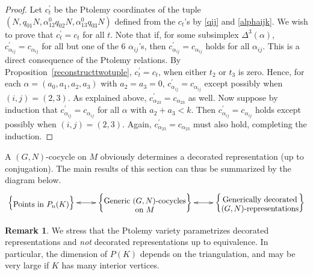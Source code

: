 \documentclass[11pt]{amsart}
\theoremstyle{definition}
\newtheorem{remark}[theorem]{Remark}
\numberwithin{equation}{section}
\def\printname#1{
        \if\draft y
                \smash{\makebox[0pt]{\hspace{-0.5in}
                        \raisebox{8pt}{\tt\tiny #1}}}
        \fi
}
\def\lbl#1{\label{#1}\printname{#1}}
\begin{document}
\begin{proof}
Let $c^\prime_t$ be the Ptolemy coordinates of the tuple $(N,q_{01}N,\alpha^0_{12}q_{02}N,\alpha^0_{13}q_{03}N)$ defined from the $c_t$'s by \eqref{qij} and \eqref{alphaijk}. We wish to prove that $c^\prime_t=c_t$ for all $t$. Note that if, for some subsimplex $\Delta^3(\alpha)$, $c^\prime_{\alpha_{ij}}=c_{\alpha_{ij}}$ for all but one of the $6$ $\alpha_{ij}$'s, then $c^\prime_{\alpha_{ij}}=c_{\alpha_{ij}}$ holds for all $\alpha_{ij}$. This is a direct consequence of the Ptolemy relations.
By Proposition~\ref{reconstructtwotuple}, $c^\prime_t=c_t$, when either $t_2$ or $t_3$ is zero.
Hence, for each $\alpha=(a_0,a_1,a_2,a_3)$ with $a_2=a_3=0$, $c^\prime_{\alpha_{ij}}=c_{\alpha_{ij}}$ except possibly when $(i,j)=(2,3)$. As explained above, $c^\prime_{\alpha_{23}}=c_{\alpha_{23}}$ as well. Now suppose by induction that $c^\prime_{\alpha_{ij}}=c_{\alpha_{ij}}$ for all $\alpha$ with $a_2+a_3<k$. Then $c^\prime_{\alpha_{ij}}=c_{\alpha_{ij}}$ holds except possibly when $(i,j)=(2,3)$. Again, $c^\prime_{\alpha_{23}}=c_{\alpha_{23}}$ must also hold, completing the induction. 
\end{proof}

A $(G,N)$-cocycle on $M$ obviously determines a decorated representation (up to conjugation). The main results of this section can thus be summarized by the diagram below.
\begin{equation}\label{summaryof1to1}
\xymatrix{\left\{\txt{Points in $P_n(K)$}\right\}\ar@{<->}[r]&\left\{\txt{Generic
$(G,N)$-cocycles\\on $M$}\right\}\ar@{<->}[r]&\left\{\txt{Generically decorated\\
$(G,N)$-representations}\right\}}
\end{equation}

\begin{remark}
We stress that the Ptolemy variety parametrizes decorated representations and \emph{not} decorated representations up to equivalence. In particular, the dimension of $P(K)$ depends on the triangulation, and may be very large if $K$ has many interior vertices. 
\end{remark}

\end{document}
